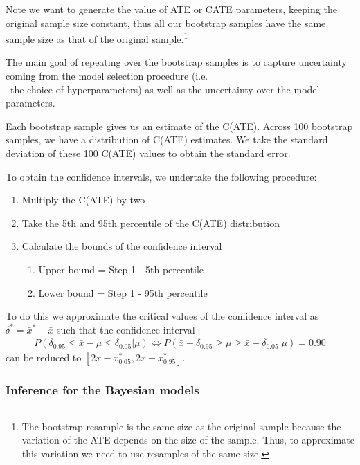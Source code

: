 \documentclass[12pt, a4paper]{article}
\begin{document}
Note we want to generate the value of ATE or CATE parameters, keeping the original sample size constant, thus all our bootstrap samples have the same sample size as that of the original sample.\footnote{The bootstrap resample is the same size as the original sample because the variation of the ATE depends on the size of the sample. Thus, to approximate this variation we need to use resamples of the same size.}

The main goal of repeating over the bootstrap samples is to capture uncertainty coming from the model selection procedure (i.e.\\~the choice of hyperparameters) as well as the uncertainty over the model parameters.

Each bootstrap sample gives us an estimate of the C(ATE). Across 100 bootstrap samples, we have a distribution of C(ATE) estimates. We take the standard deviation of these 100 C(ATE) values to obtain the standard error. 

To obtain the confidence intervals, we undertake the following procedure:
\begin{enumerate}
\item Multiply the C(ATE) by two 
\item Take the 5th and 95th percentile of the C(ATE) distribution 
\item Calculate the bounds of the confidence interval 
	\begin{enumerate}
	\item Upper bound = Step 1 - 5th percentile 
	\item Lower bound = Step 1 - 95th percentile
	\end{enumerate}
\end{enumerate}

To do this we approximate the critical values of the confidence interval as $\delta^* = \bar{x}^* - \bar{x}$ such that the confidence interval 
\begin{align*}
P(\delta_{0.95} \leq \bar{x} - \mu \leq \delta_{0.05} | \mu) \Leftrightarrow P(\bar{x} - \delta_{0.95} \geq \mu \geq \bar{x} - \delta_{0.05} | \mu) = 0.90
\end{align*}
can be reduced to $[2\bar{x} -\bar{x}^*_{0.05} , 2\bar{x}
-\bar{x}^*_{0.95}]$.


\subsubsection*{Inference for the Bayesian models}
\end{document}
